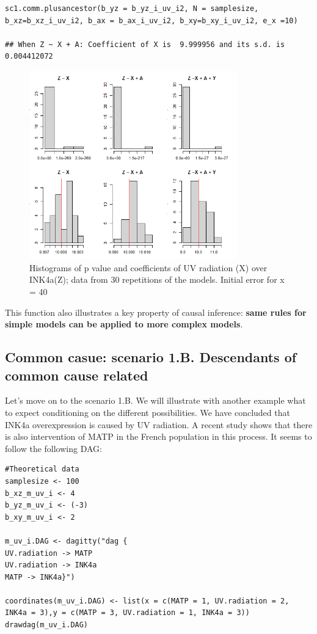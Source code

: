 \documentclass{article}
\begin{document}
\begin{lstlisting}
sc1.comm.plusancestor(b_yz = b_yz_i_uv_i2, N = samplesize, b_xz=b_xz_i_uv_i2, b_ax = b_ax_i_uv_i2, b_xy=b_xy_i_uv_i2, e_x =10)

## When Z ~ X + A: Coefficient of X is  9.999956 and its s.d. is 0.004412072
\end{lstlisting}
\begin{figure}[h]
\caption{Histograms of p value and coefficients of UV radiation (X) over INK4a(Z); data from 30 repetitions of the models. Initial error for x = 40}
\includegraphics[width=9cm]{sdXdecreased.png}
\centering
\end{figure} 
\newpage

This function also illustrates a key property of causal inference: \textbf{same rules for simple models can be applied to more complex models}.

\subsection{Common casue: scenario 1.B. Descendants of common cause related}

Let's move on to the scenario 1.B. We will illustrate with another example what to expect conditioning on the different possibilities. We have concluded that INK4a overexpression is caused by UV radiation. A recent study shows that there is also intervention of MATP in the French population in this process. It seems to follow the following DAG:\par
\begin{lstlisting}
#Theoretical data
samplesize <- 100
b_xz_m_uv_i <- 4
b_yz_m_uv_i <- (-3)
b_xy_m_uv_i <- 2

m_uv_i.DAG <- dagitty("dag {
UV.radiation -> MATP
UV.radiation -> INK4a
MATP -> INK4a}")

coordinates(m_uv_i.DAG) <- list(x = c(MATP = 1, UV.radiation = 2, INK4a = 3),y = c(MATP = 3, UV.radiation = 1, INK4a = 3))
drawdag(m_uv_i.DAG)
\end{lstlisting}
\end{document}
